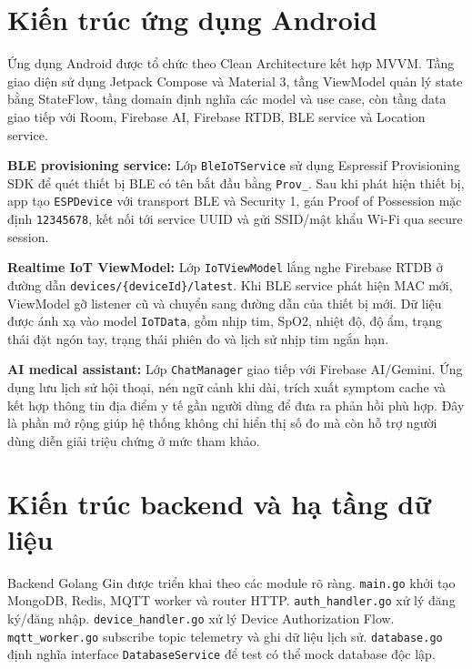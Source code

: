 \documentclass[a4paper,13pt,3p,oneside]{report}
\begin{document}
\section{Kiến trúc ứng dụng Android}
Ứng dụng Android được tổ chức theo Clean Architecture kết hợp MVVM. Tầng giao diện sử dụng Jetpack Compose và Material 3, tầng ViewModel quản lý state bằng StateFlow, tầng domain định nghĩa các model và use case, còn tầng data giao tiếp với Room, Firebase AI, Firebase RTDB, BLE service và Location service.

\textbf{BLE provisioning service:} Lớp \texttt{BleIoTService} sử dụng Espressif Provisioning SDK để quét thiết bị BLE có tên bắt đầu bằng \texttt{Prov\_}. Sau khi phát hiện thiết bị, app tạo \texttt{ESPDevice} với transport BLE và Security 1, gán Proof of Possession mặc định \texttt{12345678}, kết nối tới service UUID và gửi SSID/mật khẩu Wi-Fi qua secure session.

\textbf{Realtime IoT ViewModel:} Lớp \texttt{IoTViewModel} lắng nghe Firebase RTDB ở đường dẫn \texttt{devices/\{deviceId\}/latest}. Khi BLE service phát hiện MAC mới, ViewModel gỡ listener cũ và chuyển sang đường dẫn của thiết bị mới. Dữ liệu được ánh xạ vào model \texttt{IoTData}, gồm nhịp tim, SpO2, nhiệt độ, độ ẩm, trạng thái đặt ngón tay, trạng thái phiên đo và lịch sử nhịp tim ngắn hạn.

\textbf{AI medical assistant:} Lớp \texttt{ChatManager} giao tiếp với Firebase AI/Gemini. Ứng dụng lưu lịch sử hội thoại, nén ngữ cảnh khi dài, trích xuất symptom cache và kết hợp thông tin địa điểm y tế gần người dùng để đưa ra phản hồi phù hợp. Đây là phần mở rộng giúp hệ thống không chỉ hiển thị số đo mà còn hỗ trợ người dùng diễn giải triệu chứng ở mức tham khảo.

\section{Kiến trúc backend và hạ tầng dữ liệu}
Backend Golang Gin được triển khai theo các module rõ ràng. \texttt{main.go} khởi tạo MongoDB, Redis, MQTT worker và router HTTP. \texttt{auth\_handler.go} xử lý đăng ký/đăng nhập. \texttt{device\_handler.go} xử lý Device Authorization Flow. \texttt{mqtt\_worker.go} subscribe topic telemetry và ghi dữ liệu lịch sử. \texttt{database.go} định nghĩa interface \texttt{DatabaseService} để test có thể mock database độc lập.
\end{document}
